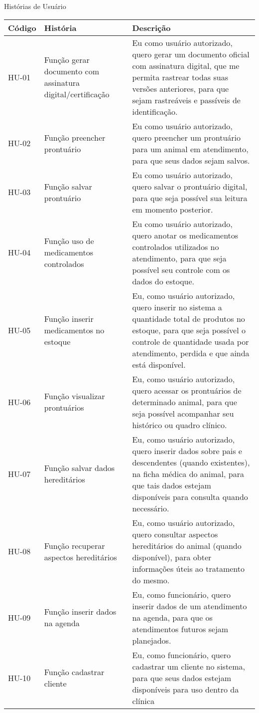\documentclass[
    12pt,               %
    openright,          %
    oneside,
    a4paper,            %
    BIBLATEX,           %
    TODO,               %
    english,            %
    brazil              %
    ]{ifsp-spo-inf-ctds}
\begin{document}
    
    \begin{center}
        \begin{quadro}[H]
        \caption{Histórias de Usuário}
        \begin{tabulary}{1.0\textwidth}{|p{5em}|p{8em}|p{18em}|}
        \hline
        Código & História & Descrição\\
        \hline
        HU-01 & Função gerar documento com assinatura digital/certificação & Eu como usuário autorizado, quero gerar um documento oficial com assinatura digital, que me permita rastrear todas suas versões anteriores, para que sejam rastreáveis e passíveis de identificação.\\
        \hline
        HU-02 & Função preencher prontuário & Eu como usuário autorizado, quero preencher um prontuário para um animal em atendimento, para que seus dados sejam salvos.\\
        \hline
        HU-03 & Função salvar prontuário & Eu como usuário autorizado, quero salvar o prontuário digital, para que seja possível sua leitura em momento posterior.\\
        \hline
        HU-04 & Função uso de medicamentos controlados & Eu como usuário autorizado, quero anotar os medicamentos controlados utilizados no atendimento, para que seja possível seu controle com os dados do estoque.\\
        \hline
        HU-05 & Função inserir medicamentos no estoque & Eu, como usuário autorizado, quero inserir no sistema a quantidade total de produtos no estoque, para que seja possível o controle de quantidade usada por atendimento, perdida e que ainda está disponível.\\
        \hline
        HU-06 & Função visualizar prontuários & Eu, como usuário autorizado, quero acessar os prontuários de determinado animal, para que seja possível acompanhar seu histórico ou quadro clínico.\\
        \hline
        HU-07 & Função salvar dados hereditários &  Eu, como usuário autorizado, quero inserir dados sobre pais e descendentes (quando existentes), na ficha médica do animal, para que tais dados estejam disponíveis para consulta quando necessário.\\
        \hline
        HU-08 &  Função recuperar aspectos hereditários &  Eu, como usuário autorizado, quero consultar aspectos hereditários do animal (quando disponível), para obter informações úteis ao tratamento do mesmo.\\
        \hline
        HU-09 & Função inserir dados na agenda & Eu, como funcionário, quero inserir dados de um atendimento na agenda, para que os atendimentos futuros sejam planejados.\\
        \hline
        HU-10 & Função cadastrar cliente & Eu, como funcionário, quero cadastrar um cliente no sistema, para que seus dados estejam disponíveis para uso dentro da clínica\\
        \hline
        \end{tabulary}


\end{quadro}
\end{center}
\end{document}
